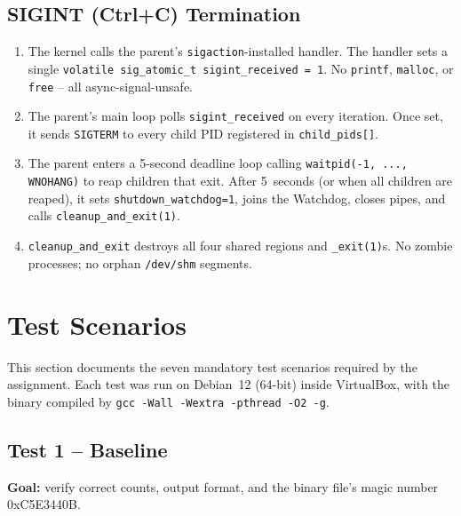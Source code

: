\documentclass[11pt,a4paper]{article}
\newcommand{\code}[1]{\texttt{\small #1}}
\begin{document}
\subsection{SIGINT (Ctrl+C) Termination}

\begin{enumerate}
    \item The kernel calls the parent's \code{sigaction}-installed
        handler. The handler sets a single
        \code{volatile sig\_atomic\_t sigint\_received = 1}. No
        \code{printf}, \code{malloc}, or \code{free} -- all
        async-signal-unsafe.

    \item The parent's main loop polls \code{sigint\_received} on every
        iteration. Once set, it sends \code{SIGTERM} to every child PID
        registered in \code{child\_pids[]}.

    \item The parent enters a 5-second deadline loop calling
        \code{waitpid(-1, ..., WNOHANG)} to reap children that exit.
        After 5~seconds (or when all children are reaped), it sets
        \code{shutdown\_watchdog=1}, joins the Watchdog, closes pipes,
        and calls \code{cleanup\_and\_exit(1)}.

    \item \code{cleanup\_and\_exit} destroys all four shared regions
        and \code{\_exit(1)}s. No zombie processes; no orphan
        \code{/dev/shm} segments.
\end{enumerate}

\section{Test Scenarios}

This section documents the seven mandatory test scenarios required by
the assignment. Each test was run on Debian~12 (64-bit) inside
VirtualBox, with the binary compiled by
\code{gcc -Wall -Wextra -pthread -O2 -g}.

\subsection{Test 1 -- Baseline}
\label{sec:test1}

\textbf{Goal:} verify correct counts, output format, and the binary
file's magic number 0xC5E3440B.
\end{document}
